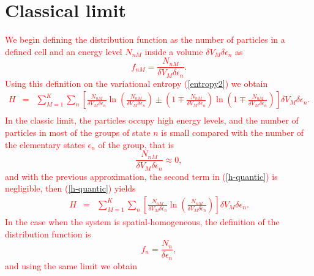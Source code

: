 \documentclass{article}
\newcommand{\de}{\delta}
\begin{document}
\section{Classical limit}
\textcolor{red}{%
We begin defining the distribution function as the number of particles in a defined cell and an energy level $N_{nM}$ inside a volume $\de V_M \delta \epsilon_n$ as
\begin{equation}
    f_{nM}=\frac{N_{nM}}{ \de V_M \delta \epsilon_{n} }.
\end{equation}
Using this definition on the variational entropy (\ref{entropy2}) we obtain
\begin{eqnarray}
    H&=& \sum_{M=1}^{K} \sum_n
    \left[  
           \frac{N_{nM}}{ \de V_M\delta \epsilon_{n}} \ln 
           \left( 
                  \frac{N_{nM}}{ \de V_M\delta \epsilon_{n}}
           \right)\pm 
           \left(  
                  1\mp \frac{N_{nM}}{ \de V_M \delta \epsilon_{n}}
           \right) \ln 
           \left(  
                   1\mp \frac{N_{nM}}{ \de V_M \delta \epsilon_{n}}
           \right)
    \right] \de V_M \delta \epsilon_{n}. \nonumber \\
    \label{h-quantic} 
\end{eqnarray}
In the classic limit, the particles occupy high energy levels, and the number of particles in most of the groups of state $n$ is small compared with the number of the elementary states $\epsilon_n$ of the group, that is
\begin{equation}
    \frac{N_{nM}}{ \de V_M \delta \epsilon_{n} } \approx 0,
\end{equation}
and with the previous approximation, the second term in (\ref{h-quantic}) is negligible, then (\ref{h-quantic}) yields
\begin{eqnarray}
    H&=& \sum_{M=1}^{K} \sum_n
    \left[  
           \frac{N_{nM}}{ \de V_M \delta \epsilon_{n}} \ln 
           \left( 
                  \frac{N_{nM}}{ \de V_M \delta \epsilon_{n}}
           \right)
    \right] \de V_M \delta \epsilon_{n}. \label{h-quantic2}
\end{eqnarray}
In the case when the system is spatial-homogeneous, the definition of the distribution function is 
\begin{equation}
    f_{n}=\frac{N_{n}}{ \delta \epsilon_{n} },
\end{equation}
and using the same limit we obtain
}
\end{document}
